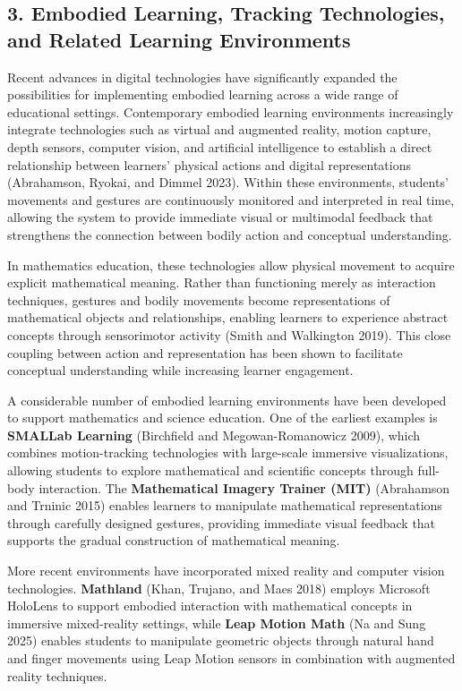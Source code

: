 \subsection{3. Embodied Learning, Tracking Technologies, and Related
Learning
Environments}\label{embodied-learning-tracking-technologies-and-related-learning-environments}

Recent advances in digital technologies have significantly expanded the
possibilities for implementing embodied learning across a wide range of
educational settings. Contemporary embodied learning environments
increasingly integrate technologies such as virtual and augmented
reality, motion capture, depth sensors, computer vision, and artificial
intelligence to establish a direct relationship between learners'
physical actions and digital representations (Abrahamson, Ryokai, and
Dimmel 2023). Within these environments, students' movements and
gestures are continuously monitored and interpreted in real time,
allowing the system to provide immediate visual or multimodal feedback
that strengthens the connection between bodily action and conceptual
understanding.

In mathematics education, these technologies allow physical movement to
acquire explicit mathematical meaning. Rather than functioning merely as
interaction techniques, gestures and bodily movements become
representations of mathematical objects and relationships, enabling
learners to experience abstract concepts through sensorimotor activity
(Smith and Walkington 2019). This close coupling between action and
representation has been shown to facilitate conceptual understanding
while increasing learner engagement.

A considerable number of embodied learning environments have been
developed to support mathematics and science education. One of the
earliest examples is \textbf{SMALLab Learning} (Birchfield and
Megowan-Romanowicz 2009), which combines motion-tracking technologies
with large-scale immersive visualizations, allowing students to explore
mathematical and scientific concepts through full-body interaction. The
\textbf{Mathematical Imagery Trainer (MIT)} (Abrahamson and Trninic
2015) enables learners to manipulate mathematical representations
through carefully designed gestures, providing immediate visual feedback
that supports the gradual construction of mathematical meaning.

More recent environments have incorporated mixed reality and computer
vision technologies. \textbf{Mathland} (Khan, Trujano, and Maes 2018)
employs Microsoft HoloLens to support embodied interaction with
mathematical concepts in immersive mixed-reality settings, while
\textbf{Leap Motion Math} (Na and Sung 2025) enables students to
manipulate geometric objects through natural hand and finger movements
using Leap Motion sensors in combination with augmented reality
techniques.

